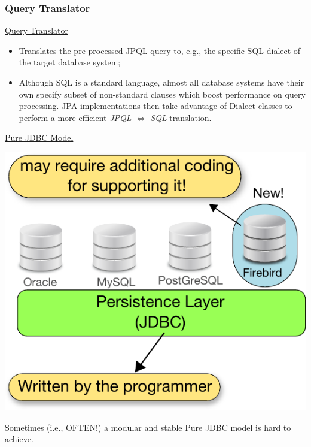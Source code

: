 \documentclass[xcolor=x11names,compress]{beamer}
\renewcommand{\(}{\begin{columns}}
\renewcommand{\)}{\end{columns}}
\newcommand{\<}[1]{\begin{column}{#1}}
\renewcommand{\>}{\end{column}}
\begin{document}
\subsubsection{Query Translator}
\begin{frame}{\underline{Query Translator}}

\begin{itemize}
\itemsep 12pt
\justifying

\item Translates the pre-processed JPQL query to, e.g., the specific SQL dialect of the target database system;

\item Although SQL is a standard language, almost all database systems have their own specify subset of non-standard clauses which boost performance on query processing. JPA implementations then take advantage of Dialect classes to perform a more efficient \textit{JPQL $\iff$ SQL} translation.
\end{itemize}

\end{frame}
\begin{frame}{\underline{Pure JDBC Model}}
\justifying

\begin{center}
\includegraphics[keepaspectratio,width=.65\textwidth]{DB-Diversity}

Sometimes (i.e., OFTEN!) a modular and stable Pure JDBC model is hard to achieve.

\end{center}

\end{frame}


\end{document}
